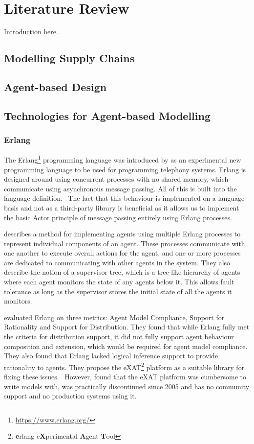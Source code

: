 \section{Literature Review}

Introduction here.

\subsection{Modelling Supply Chains}

\subsection{Agent-based Design}

\subsection{Technologies for Agent-based Modelling}

\subsubsection{Erlang}

The Erlang\footnote{\url{https://www.erlang.org/}} programming language was introduced by  as an experimental new programming language to be used for programming telephony systems.
Erlang is designed around using concurrent processes with no shared memory, which communicate using asynchronous message passing.
All of this is built into the language definition.~\cite{armstrong2007history}
The fact that this behaviour is implemented on a language basis and not as a third-party library is beneficial as it allows us to implement the basic Actor principle of message passing entirely using Erlang processes.

 describes a method for implementing agents using multiple Erlang processes to represent individual components of an agent.
These processes communicate with one another to execute overall actions for the agent, and one or more processes are dedicated to communicating with other agents in the system.
They also describe the notion of a supervisor tree, which is a tree-like hierarchy of agents where each agent monitors the state of any agents below it.
This allows fault tolerance as long as the supervisor stores the initial state of all the agents it monitors.

 evaluated Erlang on three metrics: Agent Model Compliance, Support for Rationality and Support for Distribution.
They found that while Erlang fully met the criteria for distribution support, it did not fully support agent behaviour composition and extension, which would be required for agent model compliance.
They also found that Erlang lacked logical inference support to provide rationality to agents.
They propose the eXAT\footnote{\textbf{e}rlang e\textbf{X}perimental \textbf{A}gent \textbf{T}ool} platform as a suitable library for fixing these issues.~\cite{di2003exat}
However,  found that the eXAT platform was cumbersome to write models with, was practically discontinued since 2005 and has no community support and no production systems using it.


